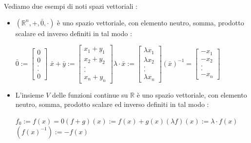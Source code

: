 \documentclass[12pt, letterpaper]{article}
\newcommand{\R}{{\mathbb R}}
\begin{document}
Vediamo due esempi di noti spazi vettoriali : \begin{itemize}
    \item \((\R^n,+,\bar 0,\cdot)\) è uno spazio vettoriale, con 
    elemento neutro, somma, prodotto scalare ed inverso definiti in tal modo :
\begin{center}
    \(\bar 0 := \begin{bmatrix}
        0\\0\\.\\.\\0
    \end{bmatrix}\)\hphantom{text}
    \(\bar x + \bar y := \begin{bmatrix}
        x_1+y_1\\x_2+y_2\\.\\.\\x_n+y_n
    \end{bmatrix}\)\hphantom{text}\(\lambda\cdot \bar x := \begin{bmatrix}
        \lambda x_1\\\lambda x_2\\.\\.\\\lambda x_n
    \end{bmatrix}\)\hphantom{text}\((\bar x)^{-1}=\begin{bmatrix}
        -x_1\\- x_2\\.\\.\\- x_n
    \end{bmatrix}\)
\end{center}
\item L'insieme \(V\) delle funzioni continue su \(\R\) è uno spazio vettoriale, con 
elemento neutro, somma, prodotto scalare ed inverso definiti in tal modo :
\begin{center}
    \(f_0 := f(x)=0\)\hphantom{txt}\((f+g)(x):=f(x)+g(x)\)\hphantom{txt}\((\lambda f)(x):=\lambda\cdot f(x)\)
\hphantom{tet}\((f(x)^{-1}):=-f(x)\)
\end{center}
\end{itemize}
\end{document}
